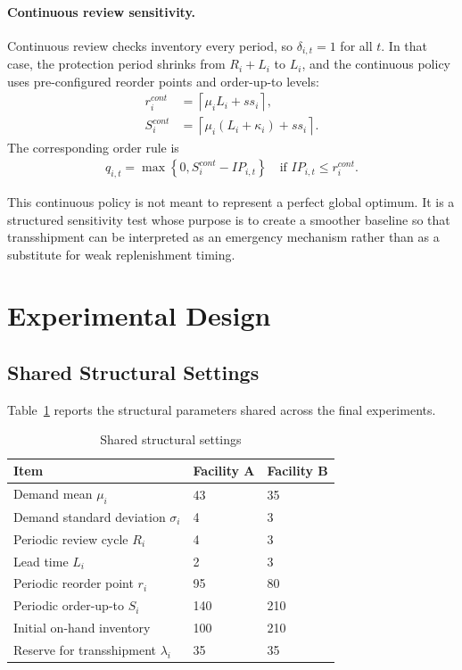 \documentclass[11pt]{article}
\begin{document}
\paragraph{Continuous review sensitivity.}
Continuous review checks inventory every period, so $\delta_{i,t}=1$ for all $t$. In that case, the protection period shrinks from $R_i+L_i$ to $L_i$, and the continuous policy uses pre-configured reorder points and order-up-to levels:
\begin{align}
r_i^{cont} &= \left\lceil \mu_i L_i + ss_i \right\rceil,\\
S_i^{cont} &= \left\lceil \mu_i (L_i + \kappa_i) + ss_i \right\rceil.
\end{align}
The corresponding order rule is
\begin{align}
q_{i,t} = \max\left\{0, S_i^{cont} - IP_{i,t}\right\}
\quad \text{if } IP_{i,t} \le r_i^{cont}.
\end{align}

This continuous policy is not meant to represent a perfect global optimum. It is a structured sensitivity test whose purpose is to create a smoother baseline so that transshipment can be interpreted as an emergency mechanism rather than as a substitute for weak replenishment timing.

\section{Experimental Design}
\subsection{Shared Structural Settings}
Table~\ref{tab:shared-structure} reports the structural parameters shared across the final experiments.

\begin{table}[H]
\centering
\caption{Shared structural settings}
\label{tab:shared-structure}
\begin{tabular}{lll}
\toprule
Item & Facility A & Facility B \\
\midrule
Demand mean $\mu_i$ & 43 & 35 \\
Demand standard deviation $\sigma_i$ & 4 & 3 \\
Periodic review cycle $R_i$ & 4 & 3 \\
Lead time $L_i$ & 2 & 3 \\
Periodic reorder point $r_i$ & 95 & 80 \\
Periodic order-up-to $S_i$ & 140 & 210 \\
Initial on-hand inventory & 100 & 210 \\
Reserve for transshipment $\lambda_i$ & 35 & 35 \\
\bottomrule
\end{tabular}
\end{table}
\end{document}
